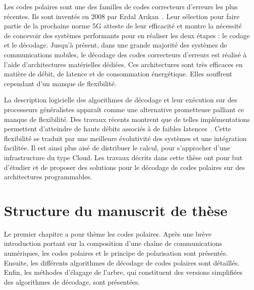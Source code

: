 Les codes polaires sont une des familles de codes correcteurs d'erreurs les plus récentes. Ils sont inventés en 2008 par Erdal Ar{\i}kan~\cite{arikan_channel_2009}. Leur sélection pour faire partie de la prochaine norme 5G atteste de leur efficacité et montre la nécessité de concevoir des systèmes performants pour en réaliser les deux étapes : le codage et le décodage. Jusqu'à présent, dans une grande majorité des systèmes de communications mobiles, le décodage des codes correcteurs d'erreurs est réalisé à l'aide d'architectures matérielles dédiées. Ces architectures sont très efficaces en matière de débit, de latence et de consommation énergétique. Elles souffrent cependant d'un manque de flexibilité.


La description logicielle des algorithmes de décodage et leur exécution sur des processeurs généralistes apparaît comme une alternative prometteuse palliant ce manque de flexibilité. Des travaux récents montrent que de telles implémentations permettent d'atteindre de hauts débits associés à de faibles latences~\cite{sarkis_fast_2014,giard_fast_2014}. Cette flexibilité se traduit par une meilleure évolutivité des systèmes et une intégration facilitée. Il est ainsi plus aisé de distribuer le calcul, pour s'approcher d'une infrastructure du type Cloud. Les travaux décrits dans cette thèse ont pour but d'étudier et de proposer des solutions pour le décodage de codes polaires sur des architectures programmables.

\section*{Structure du manuscrit de thèse}

Le premier chapitre a pour thème les codes polaires. Après une brève introduction portant sur la composition d'une chaîne de communications numériques, les codes polaires et le principe de polarisation sont présentés. Ensuite, les différents algorithmes de décodage de codes polaires sont détaillés. Enfin, les méthodes d'élagage de l'arbre, qui constituent des versions simplifiées des algorithmes de décodage, sont présentées.

